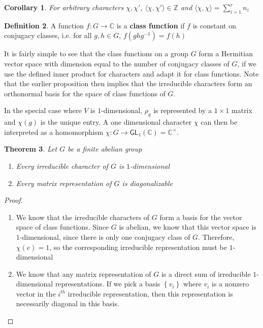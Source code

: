 \documentclass[psamsfonts]{amsart}
\newtheorem{thm}{Theorem}[section]
\newtheorem{cor}[thm]{Corollary}
\theoremstyle{definition}
\newtheorem{defn}[thm]{Definition}
\theoremstyle{remark}
\newcommand{\Z}{\mathbb{Z}}
\newcommand{\C}{\mathbb{C}}
\newcommand{\GL}{\mathsf{GL}}
\newcommand{\inv}{^{-1}}
\newcommand{\set}[1]{\left\lbrace#1 \right\rbrace}
\begin{document}
\begin{cor}
For arbitrary characters $\chi, \chi'$, $\langle \chi, \chi' \rangle \in \Z$ and $\langle \chi, \chi \rangle = \sum_{i =1}^r n_i$
\end{cor} 

\begin{defn}
A function $f: G\to \C$ is a \textbf{class function} if $f$ is constant on conjugacy classes, i.e.
for all $g, h \in G$, $f(ghg\inv) = f(h)$
\end{defn}

It is fairly simple to see that the class functions on a group $G$ form a Hermitian vector space with dimension equal to the number of conjugacy classes of $G$, if we use the defined inner product for characters and adapt it for class functions. Note that the earlier proposition then implies that the irreducible characters form an orthonormal basis for the space of class functions of $G$.


In the special case where $V$ is $1$-dimensional, $\rho_g$ is represented by a $1 \times 1$ matrix and $\chi(g)$ is the unique entry. A one dimensional character $\chi$ can then be interpreted as a homomorphism $\chi: G \to \GL_1(\C) = \C^\times$.

\begin{thm}
Let $G$ be a finite abelian group
\begin{enumerate}
\item Every irreducible character of $G$ is $1$-dimensional
\item Every matrix representation of $G$ is diagonalizable
\end{enumerate}
\end{thm}

\begin{proof}\ \\ \vspace{-\baselineskip}
\begin{enumerate}
\item We know that the irreducible characters of $G$ form a basis for the vector space of class functions. Since $G$ is abelian, we know that this vector space is $1$-dimensional, since there is only one conjugacy class of $G$. Therefore, $\chi(e) = 1$, so the corresponding irreducible representation must be $1$-dimensional
\item We know that any matrix representation of $G$ is a direct sum of irreducible $1$-dimensional representations. If we pick a basis $\set{v_i}$ where $v_i$ is a nonzero vector in the $i^{th}$ irreducible representation, then this representation is necessarily diagonal in this basis.
\end{enumerate}
\end{proof}
\end{document}

